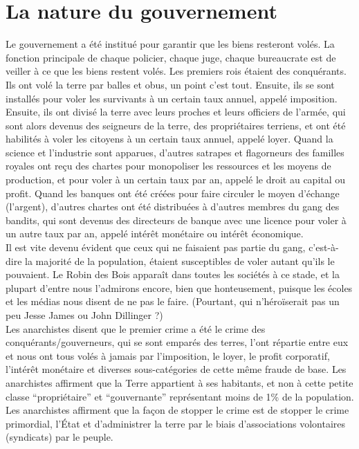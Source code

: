 \section*{La nature du gouvernement}

Le gouvernement a été institué pour garantir que les biens resteront volés. La fonction principale de chaque policier, chaque juge, chaque bureaucrate est de veiller à ce que les biens restent volés.
Les premiers rois étaient des conquérants. Ils ont volé la terre par balles et obus, un point c'est tout. Ensuite, ils se sont installés pour voler les survivants à un certain taux annuel, appelé imposition. Ensuite, ils ont divisé la terre avec leurs proches et leurs officiers de l'armée, qui sont alors devenus des seigneurs de la terre, des propriétaires terriens, et ont été habilités à voler les citoyens à un certain taux annuel, appelé loyer. Quand la science et l'industrie sont apparues, d'autres satrapes et flagorneurs des familles royales ont reçu des chartes pour monopoliser les ressources et les moyens de production, et pour voler à un certain taux par an, appelé le droit au capital ou profit. Quand les banques ont été créées pour faire circuler le moyen d'échange (l'argent), d'autres chartes ont été distribuées à d'autres membres du gang des bandits, qui sont devenus des directeurs de banque avec une licence pour voler à un autre taux par an, appelé intérêt monétaire ou intérêt économique.\\
Il est vite devenu évident que ceux qui ne faisaient pas partie du gang, c'est-à-dire la majorité de la population, étaient susceptibles de voler autant qu'ils le pouvaient. Le Robin des Bois apparaît dans toutes les sociétés à ce stade, et la plupart d'entre nous l'admirons encore, bien que honteusement, puisque les écoles et les médias nous disent de ne pas le faire. (Pourtant, qui n'héroïserait pas un peu Jesse James ou John Dillinger ?)\\
Les anarchistes disent que le premier crime a été le crime des conquérants/gouverneurs, qui se sont emparés des terres, l'ont répartie entre eux et nous ont tous volés à jamais par l'imposition, le loyer, le profit corporatif, l'intérêt monétaire et diverses sous-catégories de cette même fraude de base. Les anarchistes affirment que la Terre appartient à ses habitants, et non à cette petite classe ``propriétaire'' et ``gouvernante'' représentant moins de 1\%  de la population.\\
Les anarchistes affirment que la façon de stopper le crime est de stopper le crime primordial, l'État et d'administrer la terre par le biais d'associations volontaires (syndicats) par le peuple.\\
